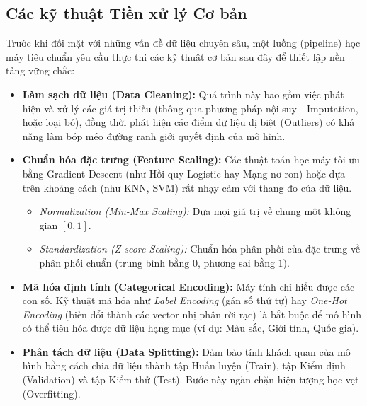 \subsection{Các kỹ thuật Tiền xử lý Cơ bản}
Trước khi đối mặt với những vấn đề dữ liệu chuyên sâu, một luồng (pipeline) học máy tiêu chuẩn yêu cầu thực thi các kỹ thuật cơ bản sau đây để thiết lập nền tảng vững chắc:
\begin{itemize}
    \item \textbf{Làm sạch dữ liệu (Data Cleaning):} Quá trình này bao gồm việc phát hiện và xử lý các giá trị thiếu (thông qua phương pháp nội suy - Imputation, hoặc loại bỏ), đồng thời phát hiện các điểm dữ liệu dị biệt (Outliers) có khả năng làm bóp méo đường ranh giới quyết định của mô hình.
    \item \textbf{Chuẩn hóa đặc trưng (Feature Scaling):} Các thuật toán học máy tối ưu bằng Gradient Descent (như Hồi quy Logistic hay Mạng nơ-ron) hoặc dựa trên khoảng cách (như KNN, SVM) rất nhạy cảm với thang đo của dữ liệu. 
    \begin{itemize}
        \item \textit{Normalization (Min-Max Scaling):} Đưa mọi giá trị về chung một không gian $[0, 1]$.
        \item \textit{Standardization (Z-score Scaling):} Chuẩn hóa phân phối của đặc trưng về phân phối chuẩn (trung bình bằng $0$, phương sai bằng $1$).
    \end{itemize}
    \item \textbf{Mã hóa định tính (Categorical Encoding):} Máy tính chỉ hiểu được các con số. Kỹ thuật mã hóa như \textit{Label Encoding} (gán số thứ tự) hay \textit{One-Hot Encoding} (biến đổi thành các vector nhị phân rời rạc) là bắt buộc để mô hình có thể tiêu hóa được dữ liệu hạng mục (ví dụ: Màu sắc, Giới tính, Quốc gia).
    \item \textbf{Phân tách dữ liệu (Data Splitting):} Đảm bảo tính khách quan của mô hình bằng cách chia dữ liệu thành tập Huấn luyện (Train), tập Kiểm định (Validation) và tập Kiểm thử (Test). Bước này ngăn chặn hiện tượng học vẹt (Overfitting).
\end{itemize}

